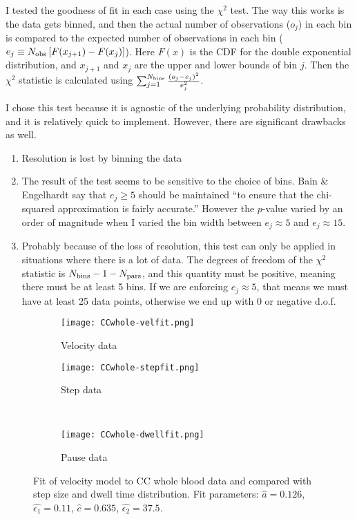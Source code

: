 \documentclass{article}
\newcommand{\tn}{\textnormal}
\begin{document}
I tested the goodness of fit in each case using the $\chi^2$ test. The
way this works is the data gets binned, and then the actual number of
observations ($o_j$) in each bin is compared to the expected number of
observations in each bin
($e_j \equiv N_\tn{obs} \left[ F(x_{j+1}) - F(x_{j}) \right]$). Here
$F(x)$ is the CDF for the double exponential distribution, and
$x_{j+1}$ and $x_{j}$ are the upper and lower bounds of bin $j$. Then
the $\chi^2$ statistic is calculated using $\sum_{j=1}^{N_\tn{bins}}
\frac{(o_j - e_j)^2}{e_j^2}$.

I chose this test because it is agnostic of the underlying probability
distribution, and it is relatively quick to implement. However, there
are significant drawbacks as well.
\begin{enumerate}
\item Resolution is lost by binning the data
\item The result of the test seems to be sensitive to the choice of
  bins. Bain \& Engelhardt say that $e_j \ge 5$ should be maintained
  ``to ensure that the chi-squared approximation is fairly accurate.''
  However the $p$-value varied by an order of magnitude when I varied
  the bin width between $e_j \approx 5$ and $e_j \approx 15$.
\item Probably because of the loss of resolution, this test can only
  be applied in situations where there is a lot of data. The degrees
  of freedom of the $\chi^2$ statistic is $N_\tn{bins} - 1 -
  N_\tn{pars}$, and this quantity must be positive, meaning there must
  be at least 5 bins. If we are enforcing $e_j \approx 5$, that means
  we must have at least 25 data points, otherwise we end up with 0 or
  negative d.o.f.
\end{enumerate}

\begin{figure}
  \centering
  \begin{subfigure}{0.48\textwidth}
    \texttt{[image: CCwhole-velfit.png]}
    \caption{Velocity data}
  \end{subfigure}
  \hfill
  \begin{subfigure}{0.48\textwidth}
    \texttt{[image: CCwhole-stepfit.png]}
    \caption{Step data}
  \end{subfigure}
  \\
  \begin{subfigure}{0.48\textwidth}
    \texttt{[image: CCwhole-dwellfit.png]}
    \caption{Pause data}
  \end{subfigure}
  \caption{Fit of velocity model to CC whole blood data and compared
    with step size and dwell time distribution. Fit parameters:
    $\hat{a} = 0.126$, $\hat{\epsilon_1} = 0.11$, $\hat{c} = 0.635$,
    $\hat{\epsilon_2} = 37.5$.}
  \label{fig:ccwhole-velfit}
\end{figure}
\end{document}
